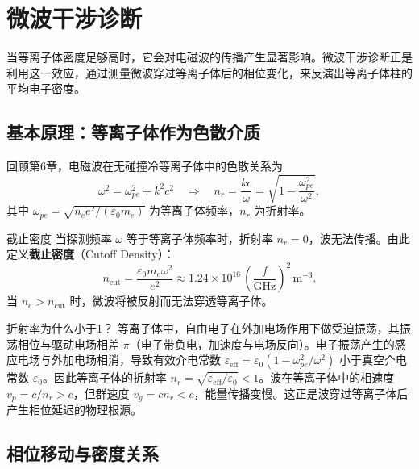 \documentclass[12pt,a4paper,openany,oneside]{book}
\newcommand{\eps}{\varepsilon}
\begin{document}
\section{微波干涉诊断}
\label{sec:12.3}

当等离子体密度足够高时，它会对电磁波的传播产生显著影响。微波干涉诊断正是利用这一效应，通过测量微波穿过等离子体后的相位变化，来反演出等离子体柱的平均电子密度。

\subsection{基本原理：等离子体作为色散介质}

回顾第6章，电磁波在无碰撞冷等离子体中的色散关系为
\begin{equation}
\omega^2 = \omega_{pe}^2 + k^2 c^2
\quad\Longrightarrow\quad
n_r = \frac{kc}{\omega} = \sqrt{1 - \frac{\omega_{pe}^2}{\omega^2}},
\label{eq:dispersion-cold}
\end{equation}
其中 $\omega_{pe} = \sqrt{n_e e^2 / (\eps_0 m_e)}$ 为等离子体频率，$n_r$ 为折射率。

\begin{definition}{截止密度}{}{}
当探测频率 $\omega$ 等于等离子体频率时，折射率 $n_r = 0$，波无法传播。由此定义\textbf{截止密度}（Cutoff Density）：
\begin{equation}
n_{\mathrm{cut}} = \frac{\eps_0 m_e \omega^2}{e^2}
\approx 1.24\times 10^{16}\,\left(\frac{f}{\mathrm{GHz}}\right)^2\,\mathrm{m}^{-3}.
\label{eq:cutoff-density}
\end{equation}
当 $n_e > n_{\mathrm{cut}}$ 时，微波将被反射而无法穿透等离子体。
\end{definition}

\begin{insight}{折射率为什么小于1？}{}
等离子体中，自由电子在外加电场作用下做受迫振荡，其振荡相位与驱动电场相差 $\pi$（电子带负电，加速度与电场反向）。电子振荡产生的感应电场与外加电场相消，导致有效介电常数 $\eps_{\mathrm{eff}} = \eps_0(1 - \omega_{pe}^2/\omega^2)$ 小于真空介电常数 $\eps_0$。因此等离子体的折射率 $n_r = \sqrt{\eps_{\mathrm{eff}}/\eps_0} < 1$。波在等离子体中的相速度 $v_p = c/n_r > c$，但群速度 $v_g = c n_r < c$，能量传播变慢。这正是波穿过等离子体后产生相位延迟的物理根源。
\end{insight}

\subsection{相位移动与密度关系}
\end{document}
